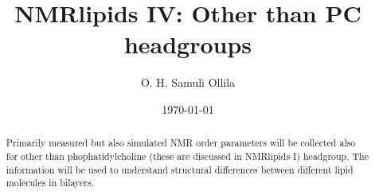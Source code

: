 \documentclass[aps,prl,superscriptaddress,twocolumn]{revtex4}
\begin{document}

\title{NMRlipids IV: Other than PC headgroups} %



\author{O. H. Samuli Ollila}



\date{\today}

\begin{abstract}
  Primarily measured but also simulated NMR order parameters will be collected also for other than phophatidylcholine
  (these are discussed in NMRlipids I) headgroup. The information will be used to understand structural differences between 
  different lipid molecules in bilayers.
\end{abstract}


\maketitle %



\end{document}
